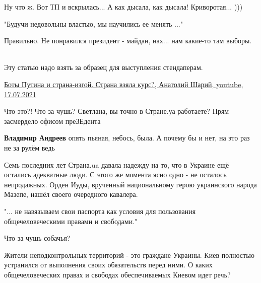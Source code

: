 \begin{itemize}
\obeycr
Ну что ж.
Вот ТП и вскрылась...
А как дысала, как дысала!
Криворотая...
)))
\restorecr


"Будучи недовольны властью, мы научились ее менять ..."

Правильно. Не понравился президент - майдан, нах... нам какие-то там выборы.
🤣🤣🤣

Эту статью надо взять за образец для выступления стендаперам. 🤣


\href{https://youtu.be/RlH_kf_lUS8}{%
Боты Путина и страна-изгой. Страна взяла курс?, Анатолий Шарий, youtube, 17.07.2021%
}

 
Что это?! Что за чушь? Светлана, вы точно в Стране.уа работаете? Прям засмердело офисом преЗЕдента

\begin{itemize}
\textbf{Владимир Андреев} опять пьяная, небось, была. А почему бы и нет, на это раз не за рулём ведь 🤣🤣
\end{itemize}

 
Семь последних лет Страна.ua давала надежду на то, что в Украине ещё остались
адекватные люди. С этого же момента ясно одно - не осталось непродажных. Орден
Иуды, врученный национальному герою украинского народа Мазепе, нашёл своего
очередного кавалера.


"... не навязываем свои паспорта как условия для пользования общечеловеческими правами и свободами."

Что за чушь собачья?

Жители неподконтрольных территорий - это граждане Украины. Киев полностью
устранился от выполнения своих обязательств перед ними. О каких
общечеловеческих правах и свободах обеспечиваемых Киевом идет речь?


\end{itemize}
